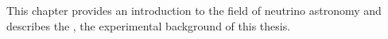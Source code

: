 This chapter provides
  an introduction to the field of neutrino astronomy
  and describes the \icecubeneutrinoobservatory{},
    the experimental background of this thesis.
